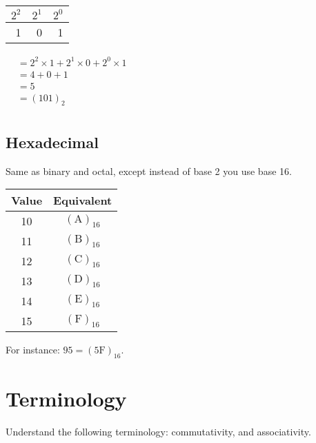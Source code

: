\begin{center}
  \begin{tabular}{r | r | r}
    $2^2$ & $2^1$ & $2^0$ \\
    \hline
        1 &      0 &      1 \\
  \end{tabular}

  \vspace{1em}

  \begin{math}
    \begin{aligned}
&= 2^2 \times 1 + 2^1 \times 0 + 2^0 \times 1 \\
&= 4 + 0 + 1 \\
&= 5 \\
&= (101)_2 \\
    \end{aligned}
  \end{math}
\end{center}

\subsection{Hexadecimal}

Same as binary and octal, except instead of base 2 you use base 16.

\begin{tabular}{c c}
  \hline
  Value & Equivalent \\
  \hline
  10 & $(\text{A})_{16}$ \\
  11 & $(\text{B})_{16}$ \\
  12 & $(\text{C})_{16}$ \\
  13 & $(\text{D})_{16}$ \\
  14 & $(\text{E})_{16}$ \\
  15 & $(\text{F})_{16}$ \\
\end{tabular}

For instance: $95 = (5\text{F})_{16}$.

\section{Terminology}

Understand the following terminology: commutativity, and associativity.
